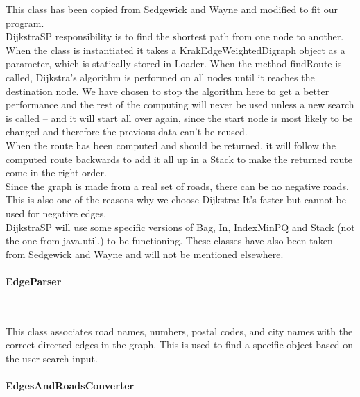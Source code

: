 \documentclass[a4paper,10pt,titlepage]{article}
\begin{document}
This class has been copied from Sedgewick and Wayne and modified to fit our program. \\
DijkstraSP responsibility is to find the shortest path from one node to another. When the class is instantiated it takes a KrakEdgeWeightedDigraph object as a parameter, which is statically stored in Loader. When the method findRoute is called, Dijkstra’s algorithm is performed on all nodes until it reaches the destination node. We have chosen to stop the algorithm here to get a better performance and the rest of the computing will never be used unless a new search is called – and it will start all over again, since the start node is most likely to be changed and therefore the previous data can’t be reused.\\
When the route has been computed and should be returned, it will follow the computed route backwards to add it all up in a Stack to make the returned route come in the right order.\\
Since the graph is made from a real set of roads, there can be no negative roads. This is also one of the reasons why we choose Dijkstra: It’s faster but cannot be used for negative edges.\\
DijkstraSP will use some specific versions of Bag\cite{sedgewickAndWayneBag}, In\cite{sedgewickAndWayneIn}, IndexMinPQ\cite{sedgewickAndWayneIndexMinPQ} and Stack\cite{sedgewickAndWayneStack} (not the one from java.util.) to be functioning. These classes have also been taken from Sedgewick and Wayne and will not be mentioned elsewhere.\\
 
				
				\paragraph{EdgeParser}\mbox{}\
				
This class associates road names, numbers, postal codes, and city names with the correct directed edges in the graph. This is used to find a specific object based on the user search input.
				
				\paragraph{EdgesAndRoadsConverter}\mbox{}\
				
\end{document}
